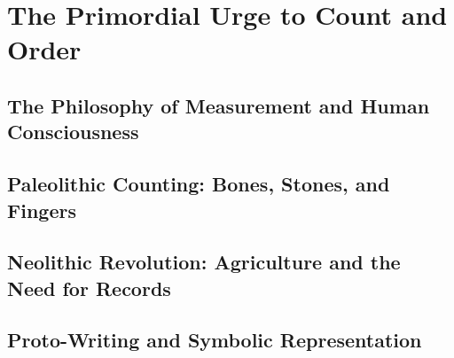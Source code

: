 
\chapter{The Primordial Urge to Count and Order}

\section{The Philosophy of Measurement and Human Consciousness}

\section{Paleolithic Counting: Bones, Stones, and Fingers}

\section{Neolithic Revolution: Agriculture and the Need for Records}

\section{Proto-Writing and Symbolic Representation}
